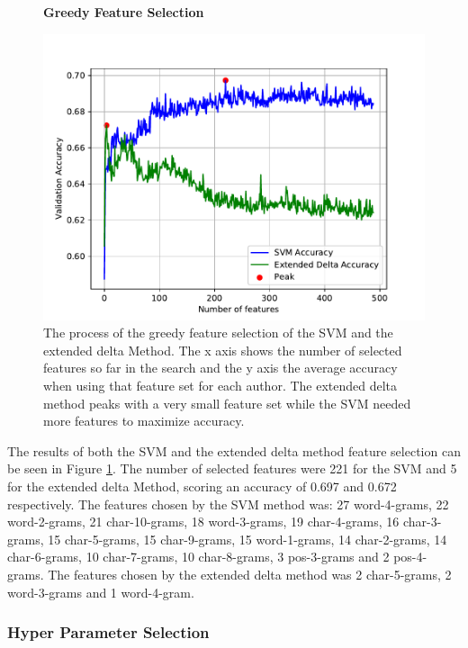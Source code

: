 \begin{figure}
    \centering
    \textbf{Greedy Feature Selection}\par\medskip
    \includegraphics[scale=0.6]{./pictures/experiments/feature_selection}
    \caption{The process of the greedy feature selection of the SVM and the
        extended delta Method. The x axis shows the number of selected features
        so far in the search and the y axis the average accuracy when using that
        feature set for each author. The extended delta method peaks with a very
        small feature set while the \gls{SVM} needed more features to maximize
        accuracy.
    }
    \label{fig:fs_results}
\end{figure}

The results of both the \gls{SVM} and the extended delta method feature
selection can be seen in Figure \ref{fig:fs_results}. The number of selected
features were 221 for the SVM and 5 for the extended delta Method, scoring an
accuracy of 0.697 and 0.672 respectively. The features chosen by the \gls{SVM}
method was: 27 word-4-grams, 22 word-2-grams, 21 char-10-grams, 18 word-3-grams,
19 char-4-grams, 16 char-3-grams, 15 char-5-grams, 15 char-9-grams, 15
word-1-grams, 14 char-2-grams, 14 char-6-grams, 10 char-7-grams, 10
char-8-grams, 3 pos-3-grams and 2 pos-4-grams. The features chosen by the
extended delta method was 2 char-5-grams, 2 word-3-grams and 1 word-4-gram.


\subsubsection{Hyper Parameter Selection}\label{sec:hyp_select}

